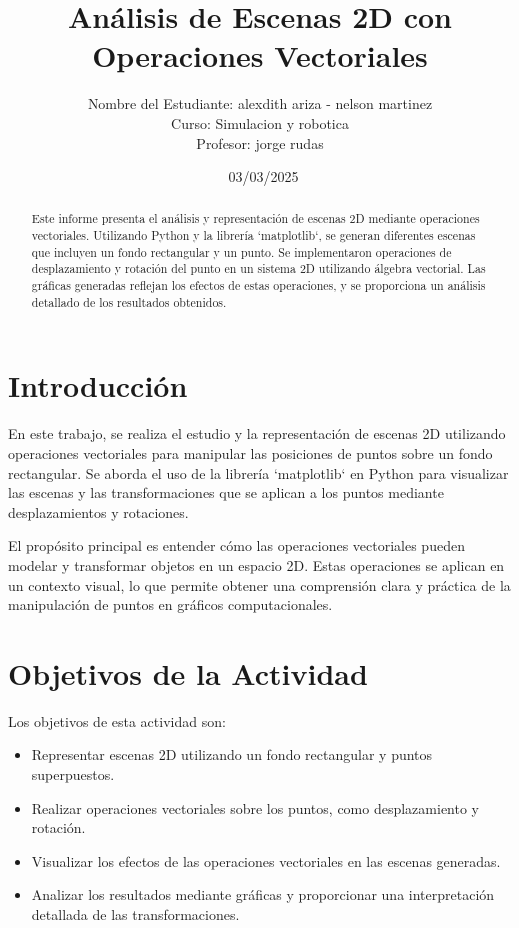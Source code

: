 \documentclass{article}
\title{Análisis de Escenas 2D con Operaciones Vectoriales}
\author{Nombre del Estudiante: alexdith ariza - nelson martinez\\
        Curso: Simulacion y robotica \\
        Profesor: jorge rudas}
\date{\ 03/03/2025}
\begin{document}
\maketitle

\begin{abstract}
Este informe presenta el análisis y representación de escenas 2D mediante operaciones vectoriales. Utilizando Python y la librería `matplotlib`, se generan diferentes escenas que incluyen un fondo rectangular y un punto. Se implementaron operaciones de desplazamiento y rotación del punto en un sistema 2D utilizando álgebra vectorial. Las gráficas generadas reflejan los efectos de estas operaciones, y se proporciona un análisis detallado de los resultados obtenidos.
\end{abstract}

\section{Introducción}
En este trabajo, se realiza el estudio y la representación de escenas 2D utilizando operaciones vectoriales para manipular las posiciones de puntos sobre un fondo rectangular. Se aborda el uso de la librería `matplotlib` en Python para visualizar las escenas y las transformaciones que se aplican a los puntos mediante desplazamientos y rotaciones.

El propósito principal es entender cómo las operaciones vectoriales pueden modelar y transformar objetos en un espacio 2D. Estas operaciones se aplican en un contexto visual, lo que permite obtener una comprensión clara y práctica de la manipulación de puntos en gráficos computacionales.

\section{Objetivos de la Actividad}
Los objetivos de esta actividad son:
\begin{itemize}
    \item Representar escenas 2D utilizando un fondo rectangular y puntos superpuestos.
    \item Realizar operaciones vectoriales sobre los puntos, como desplazamiento y rotación.
    \item Visualizar los efectos de las operaciones vectoriales en las escenas generadas.
    \item Analizar los resultados mediante gráficas y proporcionar una interpretación detallada de las transformaciones.
\end{itemize}
\end{document}
